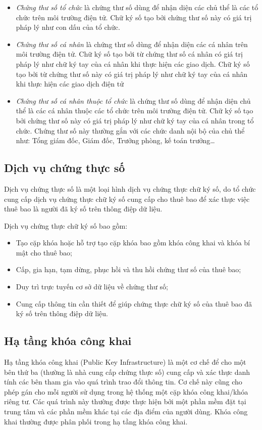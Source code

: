 \begin{itemize}
\item \emph{Chứng thư số tổ chức} là chứng thư số dùng để nhận diện các chủ thể là các tổ chức trên môi trường điện tử. Chữ ký số tạo bởi chứng thư số này có giá trị pháp lý như con dấu của tổ chức.
\item \emph{Chứng thư số cá nhân} là chứng thư số dùng để nhận diện các cá nhân trên môi trường điện tử. Chữ ký số tạo bởi từ chứng thư số cá nhân có giá trị pháp lý như chữ ký tay của cá nhân khi thực hiện các giao dịch. Chữ ký số tạo bởi từ chứng thư số này có giá trị pháp lý như chữ ký tay của cá nhân khi thực hiện các giao dịch điện tử
\item \emph{Chứng thư số cá nhân thuộc tổ chức} là chứng thư số dùng để nhận diện chủ thể là các cá nhân thuộc các tổ chức trên môi trường điện tử. Chữ ký số tạo bởi chứng thư số này có giá trị pháp lý như chữ ký tay của cá nhân trong tổ chức. Chứng thư số này thường gắn với các chức danh nội bộ của chủ thể như: Tổng giám đốc, Giám đốc, Trưởng phòng, kế toán trưởng…
\end{itemize}

\subsection{Dịch vụ chứng thực số}
Dịch vụ chứng thực số là một loại hình dịch vụ chứng thực chữ ký số, do tổ chức cung cấp dịch vụ chứng thực chữ ký số cung cấp cho thuê bao để xác thực việc thuê bao là người đã ký số trên thông điệp dữ liệu. 

Dịch vụ chứng thực chữ ký số bao gồm: 

\begin{itemize}
\item Tạo cặp khóa hoặc hỗ trợ tạo cặp khóa bao gồm khóa công khai và khóa bí mật cho thuê bao;
\item Cấp, gia hạn, tạm dừng, phục hồi và thu hồi chứng thư số của thuê bao; 
\item Duy trì trực tuyến cơ sở dữ liệu về chứng thư số; 
\item Cung cấp thông tin cần thiết để giúp chứng thực chữ ký số của thuê bao đã ký số trên thông điệp dữ liệu.
\end{itemize}

\subsection {Hạ tầng khóa công khai}
Hạ tầng khóa công khai (Public Key Infrastructure) là một cơ chế để cho một bên thứ ba (thường là nhà cung cấp chứng thực số) cung cấp và xác thực danh tính các bên tham gia vào quá trình trao đổi thông tin. Cơ chế này cũng cho phép gán cho mỗi người sử dụng trong hệ thống một cặp khóa công khai/khóa riêng tư. Các quá trình này thường được thực hiện bởi một phần mềm đặt tại trung tâm và các phần mềm khác tại các địa điểm của người dùng. Khóa công khai thường được phân phối trong hạ tầng khóa công khai.

